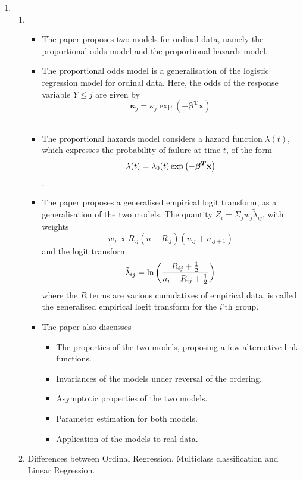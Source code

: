 \documentclass[reqno]{amsart}
\begin{document}
    \begin{enumerate}[label=\textbf{(\Roman*)}]
        \item \begin{enumerate}[label=\textbf{(\alph*)}]
            \item \begin{itemize}
                \item The paper proposes two models for ordinal data, namely the proportional odds model and the proportional hazards model.
                \item The proportional odds model is a generalisation of the logistic regression model for ordinal data. Here, the odds of the response variable \(Y \leq j\) are given by \[\mathbf{\kappa}_j = \kappa_j \exp (- \boldsymbol{\beta^T} \mathbf{x})\].
                \item The proportional hazards model considers a hazard function \(\lambda(t)\), which expresses the probability of failure at time \(t\), of the form \[\lambda(t) = \lambda_0(t) \exp \left(- \boldsymbol{\beta^T} \mathbf{x}\right)\].
                \item The paper proposes a generalised empirical logit transform, as a generalisation of the two models. The quantity \(Z_{i} = \Sigma_j w_j \tilde{\lambda}_{ij}\), with 
                weights
                \[w_j \propto R_{.j}(n - R_{.j})(n_{.j} + n_{.j+1})\]
                and the logit transform
                \[\tilde{\lambda}_{ij} = \ln \left(\frac{R_{ij} + \frac{1}{2}}{n_i - R_{ij} + \frac{1}{2}}\right)\]
                where the \(R\) terms are various cumulatives of empirical data, is called the generalised empirical logit transform for the \(i\)'th group.
                
                \item The paper also discusses \begin{itemize}
                    \item The properties of the two models, proposing a few alternative link functions.
                    \item Invariances of the models under reversal of the ordering.
                    \item Asymptotic properties of the two models.
                    \item Parameter estimation for both models.
                    \item Application of the models to real data.
                \end{itemize} 
            \end{itemize}
            \item Differences between Ordinal Regression, Multiclass classification and Linear Regression.
    

\end{enumerate}
\end{enumerate}
\end{document}
